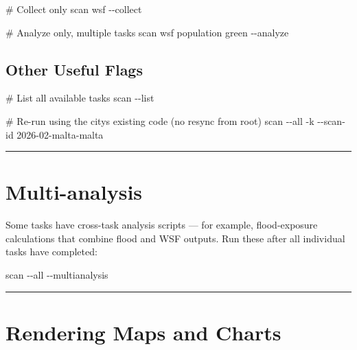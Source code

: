 \documentclass[
  letterpaper,
  DIV=11,
  numbers=noendperiod]{scrreprt}
\newenvironment{Shaded}{\begin{snugshade}}{\end{snugshade}}
\newcommand{\AttributeTok}[1]{\textcolor[rgb]{0.40,0.45,0.13}{#1}}
\newcommand{\CommentTok}[1]{\textcolor[rgb]{0.37,0.37,0.37}{#1}}
\newcommand{\ExtensionTok}[1]{\textcolor[rgb]{0.00,0.23,0.31}{#1}}
\newcommand{\NormalTok}[1]{\textcolor[rgb]{0.00,0.23,0.31}{#1}}
\begin{document}
\begin{Shaded}
\begin{Highlighting}[]
\CommentTok{\# Collect only}
\ExtensionTok{scan}\NormalTok{ wsf }\AttributeTok{{-}{-}collect}

\CommentTok{\# Analyze only, multiple tasks}
\ExtensionTok{scan}\NormalTok{ wsf population green }\AttributeTok{{-}{-}analyze}
\end{Highlighting}
\end{Shaded}

\subsection{Other Useful Flags}\label{other-useful-flags}

\begin{Shaded}
\begin{Highlighting}[]
\CommentTok{\# List all available tasks}
\ExtensionTok{scan} \AttributeTok{{-}{-}list}

\CommentTok{\# Re{-}run using the city\textquotesingle{}s existing code (no resync from root)}
\ExtensionTok{scan} \AttributeTok{{-}{-}all} \AttributeTok{{-}k} \AttributeTok{{-}{-}scan{-}id}\NormalTok{ 2026{-}02{-}malta{-}malta}
\end{Highlighting}
\end{Shaded}

\begin{center}\rule{0.5\linewidth}{0.5pt}\end{center}

\section{Multi-analysis}\label{multi-analysis}

Some tasks have cross-task analysis scripts --- for example,
flood-exposure calculations that combine flood and WSF outputs. Run
these after all individual tasks have completed:

\begin{Shaded}
\begin{Highlighting}[]
\ExtensionTok{scan} \AttributeTok{{-}{-}all} \AttributeTok{{-}{-}multianalysis}
\end{Highlighting}
\end{Shaded}

\begin{center}\rule{0.5\linewidth}{0.5pt}\end{center}

\section{Rendering Maps and Charts}\label{rendering-maps-and-charts}
\end{document}
